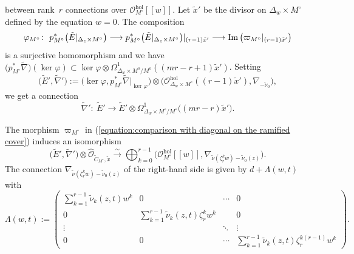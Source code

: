 \documentclass[pdftex]{sigma}
\numberwithin{equation}{section}
\newcommand\im{\mathop{\rm Im}\nolimits}
\begin{document}
between rank~$r$ connections over
${\mathcal O}^{\mathrm{hol}}_{M^{\circ}}[[w]]$.
Let $\tilde{x}'$ be the divisor on $\Delta_w\times M^{\circ}$
defined by the equation $w=0$.
The composition
\[
 \varphi_{M^{\circ}} \colon \
 p_{M^{\circ}}^*\big(\tilde{E}|_{\Delta_z\times M^{\circ}}\big)
 \longrightarrow
 p_{M^{\circ}}^*\big(\tilde{E}|_{\Delta_z\times M^{\circ}}\big)|_{(r-1)\tilde{x}'}
 \longrightarrow
 \im \big( \varpi_{M^{\circ}}|_{(r-1)\tilde{x}'} \big)
\]
is a surjective homomorphism
and we have
$\big(p_{M^{\circ}}^*\tilde{\nabla}\big) (\ker\varphi)
\subset \ker\varphi\otimes \Omega^1_{\Delta_w\times M^o/M^o}((mr-r+1)\tilde{x}')$.
Setting
\begin{equation} \label{equation: local connection on ramified cover}
 \big(\tilde{E}',\tilde{\nabla}'\big):=\big(\ker\varphi,p_{M^{\circ}}^*\tilde{\nabla}|_{\ker\varphi}\big)
 \otimes \big( {\mathcal O}_{\Delta_w\times M^{\circ}}^{\mathrm{hol}}((r-1)\tilde{x}') ,
 \nabla_{-\tilde{\nu}_0}\big),
\end{equation}
we get a connection
\[
 \tilde{\nabla}' \colon \
 \tilde{E}' \longrightarrow
 \tilde{E}' \otimes
\Omega^1_{\Delta_w\times M^{\circ}/M^{\circ}}\big((mr-r)\tilde{x}'\big).
\]

The morphism $\varpi_{M^{\circ}}$ in (\ref{equation:comparison with diagonal on the ramified cover})
induces an isomorphism
\begin{equation} \label{equation: relative ramified unramified correspondence}
 \big(\tilde{E}',\tilde{\nabla}'\big)\otimes\widehat{\mathcal O}_{\tilde{C}_{M^{\circ}},\tilde{x}}
 \stackrel{\sim}\longrightarrow
 \bigoplus_{k=0}^{r-1} \big( {\mathcal O}_{M^{\circ}}^{\mathrm{hol}}[[w]],
 \nabla_{\tilde{\nu}(\zeta_r^kw)-\tilde{\nu}_0(z)} \big).
\end{equation}
The connection $\nabla_{\tilde{\nu}(\zeta_r^kw)-\tilde{\nu}_0(z)} $
of the right-hand side is given by
$d+\Lambda(w,t)$ with
\begin{equation} \label{equation: diagonal matrix of normal form}
 \Lambda(w,t):=
 \begin{pmatrix}
 \displaystyle \sum_{k=1}^{r-1}\tilde{\nu}_k(z,t)w^k & 0 & \cdots & 0 \\
 0 & \displaystyle\sum_{k=1}^{r-1}\tilde{\nu}_k(z,t)\zeta_r^kw^k & & 0 \\
 \vdots & & \ddots & \vdots \\
 0 & 0 & \cdots & \displaystyle \sum_{k=1}^{r-1}\tilde{\nu}_k(z,t)\zeta_r^{k(r-1)}w^k
 \end{pmatrix}.
\end{equation}
\end{document}
